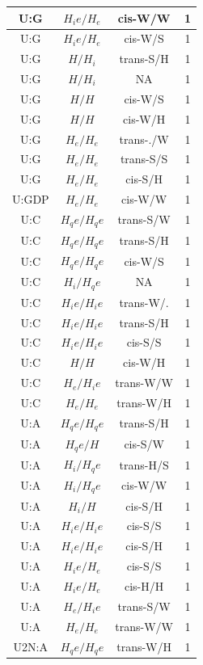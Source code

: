 \begin{center}
\begin{longtable}{c|c|c|c}
U:G & $H_ie/H_e$ & cis-W/W & 1 \\  \hline
U:G & $H_ie/H_e$ & cis-W/S & 1 \\  \hline
U:G & $H/H_i$ & trans-S/H & 1 \\  \hline
U:G & $H/H_i$ & NA & 1 \\  \hline
U:G & $H/H$ & cis-W/S & 1 \\  \hline
U:G & $H/H$ & cis-W/H & 1 \\  \hline
U:G & $H_e/H_e$ & trans-./W & 1 \\  \hline
U:G & $H_e/H_e$ & trans-S/S & 1 \\  \hline
U:G & $H_e/H_e$ & cis-S/H & 1 \\  \hline
U:GDP & $H_e/H_e$ & cis-W/W & 1 \\  \hline
U:C & $H_qe/H_qe$ & trans-S/W & 1 \\  \hline
U:C & $H_qe/H_qe$ & trans-S/H & 1 \\  \hline
U:C & $H_qe/H_qe$ & cis-W/S & 1 \\  \hline
U:C & $H_i/H_qe$ & NA & 1 \\  \hline
U:C & $H_ie/H_ie$ & trans-W/. & 1 \\  \hline
U:C & $H_ie/H_ie$ & trans-S/H & 1 \\  \hline
U:C & $H_ie/H_ie$ & cis-S/S & 1 \\  \hline
U:C & $H/H$ & cis-W/H & 1 \\  \hline
U:C & $H_e/H_ie$ & trans-W/W & 1 \\  \hline
U:C & $H_e/H_e$ & trans-W/H & 1 \\  \hline
U:A & $H_qe/H_qe$ & trans-S/H & 1 \\  \hline
U:A & $H_qe/H$ & cis-S/W & 1 \\  \hline
U:A & $H_i/H_qe$ & trans-H/S & 1 \\  \hline
U:A & $H_i/H_qe$ & cis-W/W & 1 \\  \hline
U:A & $H_i/H$ & cis-S/H & 1 \\  \hline
U:A & $H_ie/H_ie$ & cis-S/S & 1 \\  \hline
U:A & $H_ie/H_ie$ & cis-S/H & 1 \\  \hline
U:A & $H_ie/H_e$ & cis-S/S & 1 \\  \hline
U:A & $H_ie/H_e$ & cis-H/H & 1 \\  \hline
U:A & $H_e/H_ie$ & trans-S/W & 1 \\  \hline
U:A & $H_e/H_e$ & trans-W/W & 1 \\  \hline
U2N:A & $H_qe/H_qe$ & trans-W/H & 1 \\  \hline

\end{longtable}
\end{center}
